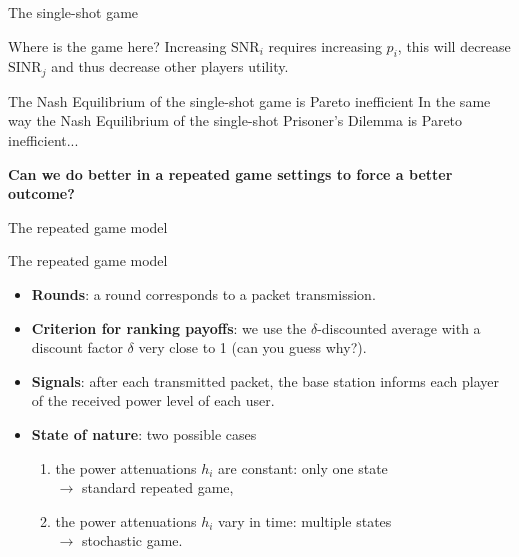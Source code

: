 \begin{frame}{The single-shot game}
    \begin{block}{Where is the game here?}
        Increasing $\text{SNR}_i$ requires increasing $p_i$, this will decrease $\text{SINR}_j$ and
        thus decrease other players utility.
    \end{block}
    \pause 
    \vspace{0.5cm}
    \begin{alertblock}{The Nash Equilibrium of the single-shot game is Pareto inefficient}
        In the same way the Nash Equilibrium of the single-shot Prisoner's Dilemma is
        Pareto inefficient...
    \end{alertblock}
    \pause
    \vspace{0.5cm}
    \textbf{{\color{green}Can we do better in a repeated game settings to force a better outcome?}}
\end{frame}

\begin{frame}{The repeated game model}
    \begin{exampleblock}{The repeated game model}
        \begin{itemize}
            \pause
            \item \textbf{Rounds}: a round corresponds to a packet transmission.
            \pause
            \item \textbf{Criterion for ranking payoffs}: we use the $\delta$-discounted average with a
            discount factor $\delta$ very close to 1 (can you guess why?).
            \pause
            \item \textbf{Signals}: after each transmitted packet, the base station informs each player
            of the received power level of each user.
            \pause
            \item \textbf{State of nature}: two possible cases
            \begin{enumerate}
                \pause
                \item the power attenuations $h_i$ are constant: only one state\\
                $\to$ standard repeated game,
                \pause
                \item the power attenuations $h_i$ vary in time: multiple states\\
                $\to$ stochastic game.
            \end{enumerate}
        \end{itemize}
    \end{exampleblock}
\end{frame}

